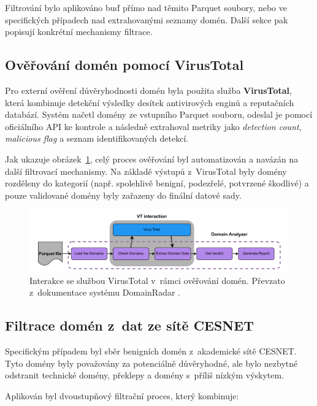 Filtrování bylo aplikováno buď přímo nad těmito Parquet soubory, nebo ve specifických případech nad extrahovanými seznamy domén. Další sekce pak popisují konkrétní mechanismy filtrace.


\subsection{Ověřování domén pomocí VirusTotal}

Pro externí ověření důvěryhodnosti domén byla použita služba \textbf{VirusTotal}, která kombinuje detekční výsledky desítek antivirových enginů a reputačních databází. Systém načetl domény ze vstupního Parquet souboru, odeslal je pomocí oficiálního API ke kontrole a následně extrahoval metriky jako \textit{detection count}, \textit{malicious flag} a seznam identifikovaných detekcí.

Jak ukazuje obrázek~\ref{fig:vt_interaction}, celý proces ověřování byl automatizován a navázán na další filtrovací mechanismy. Na základě výstupů z~VirusTotal byly domény rozděleny do kategorií (např. spolehlivě benigní, podezřelé, potvrzené škodlivé) a pouze validované domény byly zařazeny do finální datové sady.

\begin{figure}[H]
    \centering
    \includegraphics[width=1.0\textwidth]{obrazky-figures/vt.pdf}
    \caption{Interakce se službou VirusTotal v~rámci ověřování domén. Převzato z~dokumentace systému DomainRadar \cite{domainradar}.}
    \label{fig:vt_interaction}
\end{figure}

\subsection{Filtrace domén z~dat ze sítě CESNET}

Specifickým případem byl sběr benigních domén z~akademické sítě CESNET. Tyto domény byly považovány za potenciálně důvěryhodné, ale bylo nezbytné odstranit technické domény, překlepy a domény s~příliš nízkým výskytem.

Aplikován byl dvoustupňový filtrační proces, který kombinuje:

